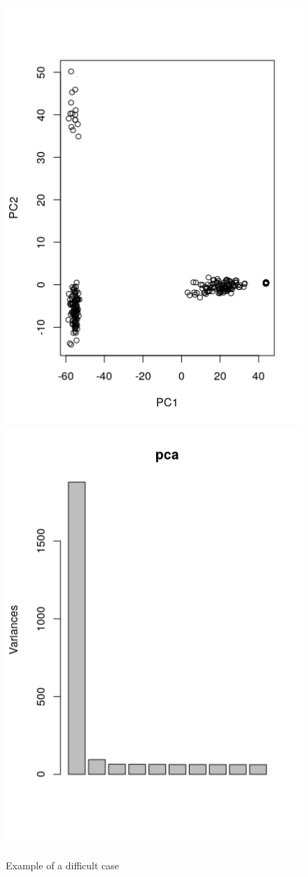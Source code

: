 \documentclass[a4paper, 11pt]{article}
\begin{document}
\begin{figure}[h!]
\caption{Example of a difficult case}
\includegraphics[scale=0.6]{Rplot_hard_example}
\includegraphics[scale=0.6]{hard_example_eigenvalues}

\end{figure}
\end{document}
